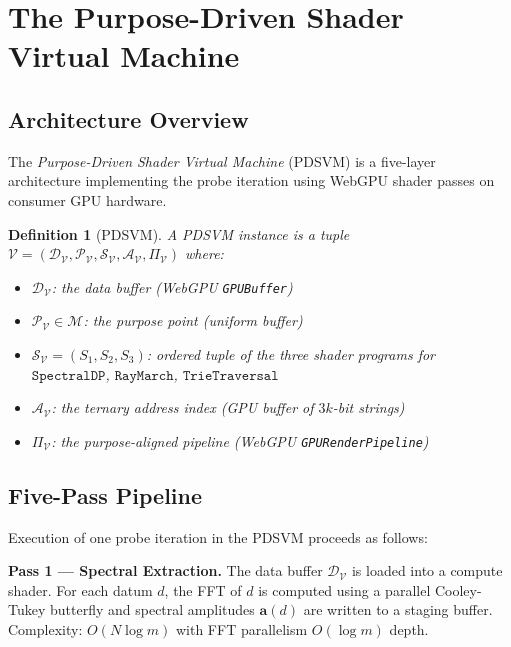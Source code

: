 \documentclass[10pt,twocolumn]{article}
\newtheorem{definition}[theorem]{Definition}
\newcommand{\PurposePoint}{\mathcal{P}}
\newcommand{\DataSpace}{\mathcal{D}}
\newcommand{\ManifoldM}{\mathcal{M}}
\begin{document}
\section{The Purpose-Driven Shader Virtual Machine}
\label{sec:pdsvm}

\subsection{Architecture Overview}

The \emph{Purpose-Driven Shader Virtual Machine} (PDSVM) is a
five-layer architecture implementing the probe iteration
using WebGPU shader passes on consumer GPU hardware.

\begin{definition}[PDSVM]
\label{def:pdsvm}
A PDSVM instance is a tuple
$\mathcal{V} = (\DataSpace_\mathcal{V}, \PurposePoint_\mathcal{V},
\mathcal{S}_\mathcal{V}, \mathcal{A}_\mathcal{V}, \Pi_\mathcal{V})$
where:
\begin{itemize}
\item $\DataSpace_\mathcal{V}$: the data buffer (WebGPU \texttt{GPUBuffer})
\item $\PurposePoint_\mathcal{V} \in \ManifoldM$: the purpose point
      (uniform buffer)
\item $\mathcal{S}_\mathcal{V} = (S_1, S_2, S_3)$: ordered tuple of the three
      shader programs for $\mathtt{SpectralDP}$, $\mathtt{RayMarch}$, $\mathtt{TrieTraversal}$
\item $\mathcal{A}_\mathcal{V}$: the ternary address index (GPU buffer of $3k$-bit strings)
\item $\Pi_\mathcal{V}$: the purpose-aligned pipeline (WebGPU \texttt{GPURenderPipeline})
\end{itemize}
\end{definition}

\subsection{Five-Pass Pipeline}

Execution of one probe iteration in the PDSVM proceeds as follows:

\textbf{Pass 1 --- Spectral Extraction.}
The data buffer $\DataSpace_\mathcal{V}$ is loaded into a compute shader.
For each datum $d$, the FFT of $d$ is computed using a parallel
Cooley-Tukey butterfly \cite{coolidge1965} and spectral amplitudes $\mathbf{a}(d)$
are written to a staging buffer.
Complexity: $O(N \log m)$ with FFT parallelism $O(\log m)$ depth.
\end{document}
